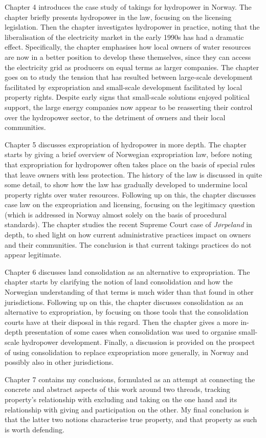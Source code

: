 {Chapter 4 introduces the case study of takings for hydropower in Norway. The chapter briefly presents hydropower in the law, focusing on the licensing legislation. Then the chapter investigates hydropower in practice, noting that the liberalisation of the electricity market in the early 1990s has had a dramatic effect. Specifically, the chapter emphasises how local owners of water resources are now in a better position to develop these themselves, since they can access the electricity grid as producers on equal terms as larger companies. The chapter goes on to study the tension that has resulted between large-scale development facilitated by expropriation and small-scale development facilitated by local property rights. Despite early signs that small-scale solutions enjoyed political support, the large energy companies now appear to be reasserting their control over the hydropower sector, to the detriment of owners and their local communities.

Chapter 5 discusses expropriation of hydropower in more depth. The chapter starts by giving a brief overview of Norwegian expropriation law, before noting that expropriation for hydropower often takes place on the basis of special rules that leave owners with less protection. The history of the law is discussed in quite some detail, to show how the law has gradually developed to undermine local property rights over water resources. Following up on this, the chapter discusses case law on the expropriation and licensing, focusing on the legitimacy question (which is addressed in Norway almost solely on the basis of procedural standards). The chapter studies the recent Supreme Court case of {\it Jørpeland} in depth, to shed light on how current administrative practices impact on owners and their communities. The conclusion is that current takings practices do not appear legitimate.

Chapter 6 discusses land consolidation as an alternative to expropriation. The chapter starts by clarifying the notion of land consolidation and how the Norwegian understanding of that terms is much wider than that found in other jurisdictions. Following up on this, the chapter discusses consolidation as an alternative to expropriation, by focusing on those tools that the consolidation courts have at their disposal in this regard. Then the chapter gives a more in-depth presentation of some cases when consolidation was used to organise small-scale hydropower development. Finally, a discussion is provided on the prospect of using consolidation to replace expropriation more generally, in Norway and possibly also in other jurisdictions.

Chapter 7 contains my conclusions, formulated as an attempt at connecting the concrete and abstract aspects of this work around two threads, tracking property's relationship with excluding and taking on the one hand and its relationship with giving and participation on the other. My final conclusion is that the latter two notions characterise true property, and that property as such is worth defending.

} 
